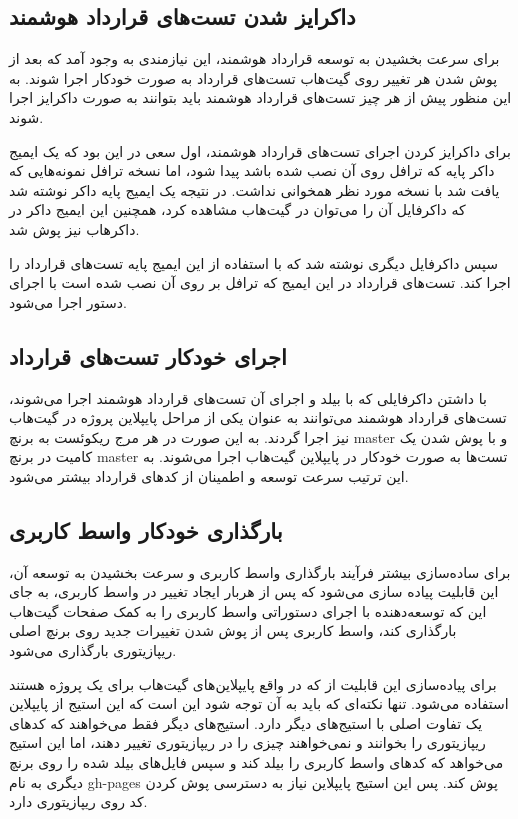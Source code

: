 \subsection{داکرایز شدن تست‌های قرارداد هوشمند}
برای سرعت بخشیدن به توسعه قرارداد هوشمند، این نیازمندی به وجود آمد که بعد از پوش شدن هر تغییر روی گیت‌هاب تست‌های قرارداد به صورت خودکار اجرا شوند. به این منظور پیش از هر چیز تست‌های قرارداد هوشمند باید بتوانند به صورت داکرایز اجرا شوند.

برای داکرایز کردن اجرای تست‌های قرارداد هوشمند، اول سعی در این بود که یک ایمیج داکر پایه که ترافل روی آن نصب شده باشد پیدا شود، اما نسخه ترافل نمونه‌هایی که یافت شد با نسخه مورد نظر همخوانی نداشت. در نتیجه یک ایمیج پایه داکر نوشته شد که داکرفایل آن را می‌توان در گیت‌هاب
مشاهده کرد، همچنین این ایمیج داکر در داکرهاب
نیز پوش شد.

سپس داکرفایل دیگری نوشته شد که با استفاده از این ایمیج پایه تست‌های قرارداد را اجرا کند. تست‌های قرارداد در این ایمیج که ترافل بر روی آن نصب شده است با اجرای دستور
اجرا می‌شود.


\subsection{اجرای خودکار تست‌های قرارداد}
با داشتن داکرفایلی که با بیلد و اجرای آن تست‌های قرارداد هوشمند اجرا می‌شوند، تست‌های قرارداد هوشمند می‌توانند به عنوان یکی از مراحل پایپلاین پروژه در گیت‌هاب نیز اجرا گردند. به این صورت در هر مرج ریکوئست به برنچ master و با پوش شدن یک کامیت در برنچ master تست‌ها به صورت خودکار در پایپلاین گیت‌هاب اجرا می‌شوند. به این ترتیب سرعت توسعه و اطمینان از کدهای قرارداد بیشتر می‌شود.


\subsection{بارگذاری خودکار واسط کاربری}
برای ساده‌سازی بیشتر فرآیند بارگذاری واسط کاربری و سرعت بخشیدن به توسعه آن، این قابلیت پیاده سازی می‌شود که پس از هربار ایجاد تغییر در واسط کاربری، به جای این که توسعه‌دهنده با اجرای دستوراتی واسط کاربری را به کمک صفحات گیت‌هاب بارگذاری کند، واسط کاربری پس از پوش شدن تغییرات جدید روی برنچ اصلی ریپازیتوری بارگذاری می‌شود.

برای پیاده‌سازی این قابلیت از
که در واقع پایپلاین‌های گیت‌هاب برای یک پروژه هستند استفاده می‌شود. تنها نکته‌ای که باید به آن توجه شود این است که این استیج از پایپلاین یک تفاوت اصلی با استیج‌های دیگر دارد. استیج‌های دیگر فقط می‌خواهند که کدهای ریپازیتوری را بخوانند و نمی‌خواهند چیزی را در ریپازیتوری تغییر دهند، اما این استیج می‌خواهد که کد‌های واسط کاربری را بیلد کند و سپس فایل‌های بیلد شده را روی برنچ دیگری به نام gh-pages پوش کند. پس این استیج پایپلاین نیاز به دسترسی پوش کردن کد روی ریپازیتوری دارد.

